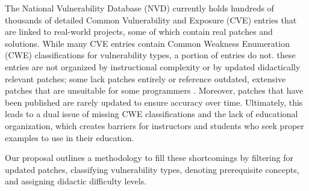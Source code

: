 The National Vulnerability Database (NVD) currently holds hundreds of thousands of detailed Common Vulnerability and Exposure (CVE) entries that are linked to real-world projects, some of which contain real patches and solutions. While many CVE entries contain Common Weakness Enumeration (CWE) classifications for vulnerability types, a portion of entries do not.  these entries are not organized by instructional complexity or by updated didactically relevant patches; some lack patches entirely or reference outdated, extensive patches that are unsuitable for some programmers \cite{nvidcweslice}. Moreover, patches that have been published are rarely updated to ensure accuracy over time. Ultimately, this leads to a dual issue of missing CWE classifications and the lack of educational organization, which creates barriers for instructors and students who seek proper examples to use in their education.

Our proposal outlines a methodology to fill these shortcomings by filtering for updated patches, classifying vulnerability types, denoting prerequisite concepts, and assigning didactic difficulty levels.